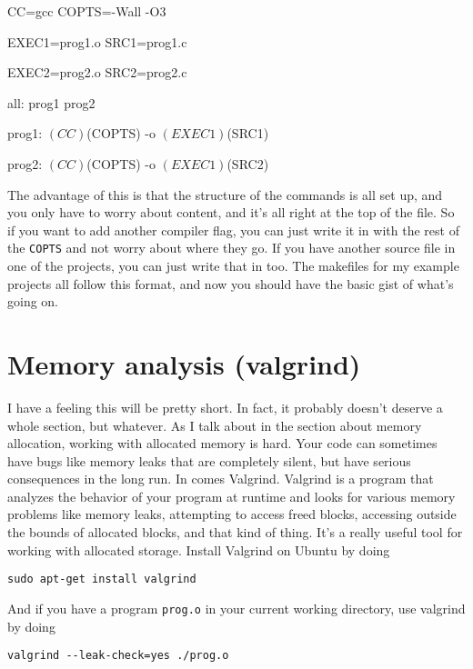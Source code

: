 \documentclass[ebook,11pt,oneside,openany]{memoir}
\newcommand{\cf}[1]{\texttt{#1}}
\begin{document}
\pagebreak

\begin{code}[language=make]
CC=gcc
COPTS=-Wall -O3

EXEC1=prog1.o
SRC1=prog1.c

EXEC2=prog2.o
SRC2=prog2.c

all: prog1 prog2

prog1:
	$(CC) $(COPTS) -o $(EXEC1) $(SRC1)
    
prog2:
	$(CC) $(COPTS) -o $(EXEC1) $(SRC2)
\end{code}

The advantage of this is that the structure of the commands is all set up, and you only have to worry about content, and it's all right at the top of the file. So if you want to add another compiler flag, you can just write it in with the rest of the \cf{COPTS} and not worry about where they go. If you have another source file in one of the projects, you can just write that in too. The makefiles for my example projects all follow this format, and now you should have the basic gist of what's going on.

\section{Memory analysis (valgrind)}

I have a feeling this will be pretty short. In fact, it probably doesn't deserve a whole section, but whatever. As I talk about in the section about memory allocation, working with allocated memory is hard. Your code can sometimes have bugs like memory leaks that are completely silent, but have serious consequences in the long run. In comes Valgrind. Valgrind is a program that analyzes the behavior of your program at runtime and looks for various memory problems like memory leaks, attempting to access freed blocks, accessing outside the bounds of allocated blocks, and that kind of thing. It's a really useful tool for working with allocated storage. Install Valgrind on Ubuntu by doing

\begin{verbatim}
sudo apt-get install valgrind
\end{verbatim}

And if you have a program \cf{prog.o} in your current working directory, use valgrind by doing

\begin{verbatim}
valgrind --leak-check=yes ./prog.o
\end{verbatim}
\end{document}
